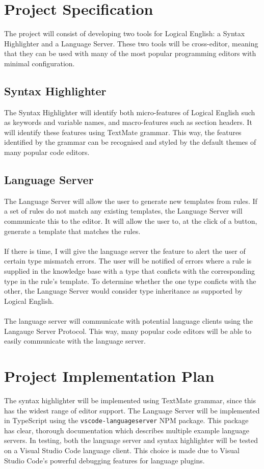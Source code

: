 \documentclass[../main.tex]{subfiles}
\begin{document}
\section*{Project Specification}
The project will consist of developing two tools for Logical English: a Syntax Highlighter and a Language Server. These two tools will be cross-editor, meaning that they can be used with many of the most popular programming editors with minimal configuration.

\subsection*{Syntax Highlighter}
The Syntax Highlighter will identify both micro-features of Logical English such as keywords and variable names, and macro-features such as section headers. It will identify these features using TextMate grammar. This way, the features identified by the grammar can be recognised and styled by the default themes of many popular code editors. 

\subsection*{Language Server}
The Language Server will allow the user to generate new templates from rules. If a set of rules do not match any existing templates, the Language Server will communicate this to the editor. It will allow the user to, at the click of a button, generate a template that matches the rules. 
\\ \\ 
If there is time, I will give the language server the feature to alert the user of certain type mismatch errors. The user will be notified of errors where a rule is supplied in the knowledge base with a type that conficts with the corresponding type in the rule's template. To determine whether the one type conficts with the other, the Language Server would consider type inheritance as supported by Logical English.
\\ \\
The language server will communicate with potential language clients using the Langauge Server Protocol. This way, many popular code editors will be able to easily communicate with the language server.

\section*{Project Implementation Plan}
The syntax highlighter will be implemented using TextMate grammar, since this has the widest range of editor support.  The Language Server will be implemented in TypeScript using the \texttt{vscode-languageserver} NPM package. This package has clear, thorough documentation which describes multiple example language servers. In testing, both the language server and syntax highlighter will be tested on a Visual Studio Code language client. This choice is made due to Visual Studio Code's powerful debugging features for language plugins.
\end{document}
